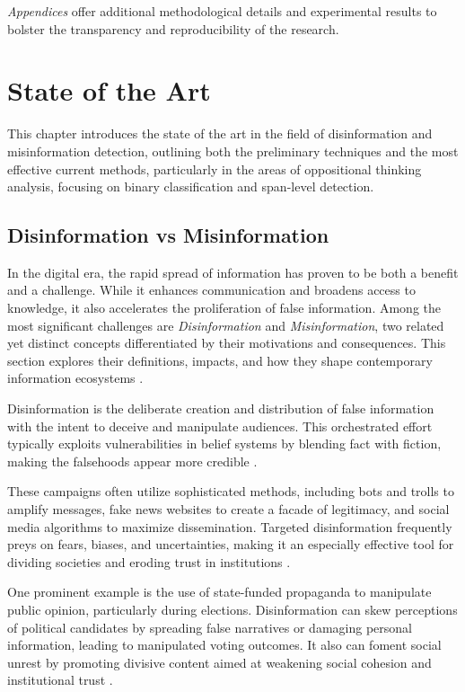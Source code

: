 \documentclass{Configuration_Files/PoliMi3i_thesis}
\begin{document}
\textit{Appendices} offer additional methodological details and experimental results to bolster the transparency and reproducibility of the research.


\chapter{State of the Art} \label{chap:state_of_the_art}
This chapter introduces the state of the art in the field of disinformation and misinformation detection, outlining both the preliminary techniques and the most effective current methods, particularly in the areas of oppositional thinking analysis, focusing on binary classification and span-level detection.

\section{Disinformation vs Misinformation} \label{sec:disinformation_vs_misinformation}
In the digital era, the rapid spread of information has proven to be both a benefit and a challenge. While it enhances communication and broadens access to knowledge, it also accelerates the proliferation of false information. Among the most significant challenges are \textit{Disinformation} and \textit{Misinformation}, two related yet distinct concepts differentiated by their motivations and consequences. This section explores their definitions, impacts, and how they shape contemporary information ecosystems \cite{lazer2018science}.

Disinformation is the deliberate creation and distribution of false information with the intent to deceive and manipulate audiences. This orchestrated effort typically exploits vulnerabilities in belief systems by blending fact with fiction, making the falsehoods appear more credible \cite{ferrara2017disinformation}.

These campaigns often utilize sophisticated methods, including bots and trolls to amplify messages, fake news websites to create a facade of legitimacy, and social media algorithms to maximize dissemination. Targeted disinformation frequently preys on fears, biases, and uncertainties, making it an especially effective tool for dividing societies and eroding trust in institutions \cite{shao2017spread}.

One prominent example is the use of state-funded propaganda to manipulate public opinion, particularly during elections. Disinformation can skew perceptions of political candidates by spreading false narratives or damaging personal information, leading to manipulated voting outcomes. It also can foment social unrest by promoting divisive content aimed at weakening social cohesion and institutional trust \cite{allcott2017, bovet2019influence}.
\end{document}
